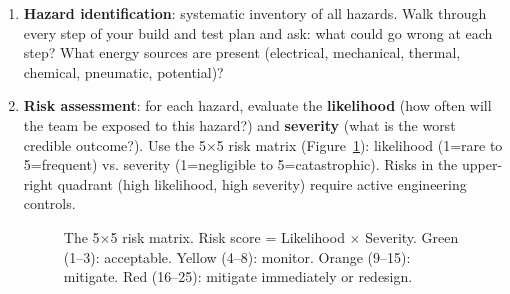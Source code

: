 \begin{enumerate}[nosep,leftmargin=1.5em]
\item \textbf{Hazard identification}: systematic inventory of all hazards. Walk through every step of your build and test plan and ask: what could go wrong at each step? What energy sources are present (electrical, mechanical, thermal, chemical, pneumatic, potential)?
\item \textbf{Risk assessment}: for each hazard, evaluate the \textbf{likelihood} (how often will the team be exposed to this hazard?) and \textbf{severity} (what is the worst credible outcome?). Use the 5$\times$5 risk matrix (Figure~\ref{fig:risk-matrix}): likelihood (1=rare to 5=frequent) vs. severity (1=negligible to 5=catastrophic). Risks in the upper-right quadrant (high likelihood, high severity) require active engineering controls.

\begin{figure}[htbp]
\centering
{}
\caption{The 5$\times$5 risk matrix. Risk score = Likelihood $\times$ Severity. Green (1--3): acceptable. Yellow (4--8): monitor. Orange (9--15): mitigate. Red (16--25): mitigate immediately or redesign.}\label{fig:risk-matrix}
\end{figure}



\end{enumerate}
